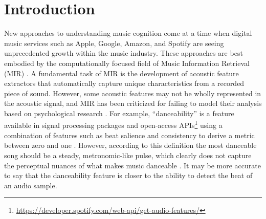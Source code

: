 \section{Introduction}
New approaches to understanding music cognition come at a time when digital music services such as Apple, Google, Amazon, and Spotify are seeing unprecedented growth within the music industry. These approaches are best embodied by the computationally focused field of Music Information Retrieval (MIR) \cite{downie2003music}. A fundamental task of MIR is the development of acoustic feature extractors that automatically capture unique characteristics from a recorded piece of sound. However, some acoustic features may not be wholly represented in the acoustic signal, and MIR has been criticized for failing to model their analysis based on psychological research \cite{aucouturier2013seven}. For example, ``danceability'' is a feature available in signal processing packages \cite{bogdanov2013essentia,bogdanov2009low} and open-access APIs\footnote{\url{https://developer.spotify.com/web-api/get-audio-features/}} using a combination of features such as beat salience and consistency to derive a metric between zero and one \cite{streich2005detrended}. However, according to this definition the most danceable song should be a steady, metronomic-like pulse, which clearly does not capture the perceptual nuances of what makes music danceable \cite{friberg2014using}. It may be more accurate to say that the danceability feature is closer to the ability to detect the beat of an audio sample. 

